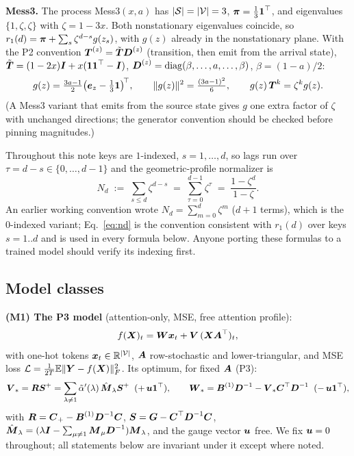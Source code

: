 \documentclass{article}
\begin{document}
\textbf{Mess3.} The process Mess3$(x,a)$ has ${\vert \mathcal{S}\vert} = {\vert \mathcal{V}\vert} = 3$, $\boldsymbol{\pi} = \tfrac13\boldsymbol{1}^\top$, and eigenvalues $\{1, \zeta, \zeta\}$ with $\zeta = 1 - 3x$. Both nonstationary eigenvalues coincide, so $r_1(d) = \boldsymbol{\pi} + \sum_s \zeta^{d-s} g(z_s)$, with $g(z)$ already in the nonstationary plane. With the P2 convention $\boldsymbol{T}^{(z)} = \tilde{\boldsymbol{T}}\boldsymbol{D}^{(z)}$ (transition, then emit from the arrival state), $\tilde{\boldsymbol{T}} = (1-2x)\boldsymbol{I} + x(\boldsymbol{1}\boldsymbol{1}^\top - \boldsymbol{I})$, $\boldsymbol{D}^{(z)} = \mathrm{diag}(\beta, \dots, a, \dots, \beta)$, $\beta = (1-a)/2$:
\begin{equation}\label{eq:gz}
    g(z) = \tfrac{3a-1}{2}\big(\boldsymbol{e}_z - \tfrac13\boldsymbol{1}\big)^{\!\top}, \qquad
    \|g(z)\|^2 = \tfrac{(3a-1)^2}{6}, \qquad
    g(z)\,\boldsymbol{T}^{k} = \zeta^{k} g(z) .
\end{equation}
(A Mess3 variant that emits from the source state gives $g$ one extra factor of $\zeta$ with unchanged directions; the generator convention should be checked before pinning magnitudes.)

\begin{remark}\label{rem:nd}
Throughout this note keys are $1$-indexed, $s = 1, \dots, d$, so lags run over $\tau = d-s \in \{0, \dots, d-1\}$ and the geometric-profile normalizer is
\begin{equation}\label{eq:nd}
    N_d \;:=\; \sum_{s \le d}\zeta^{d-s} \;=\; \sum_{\tau=0}^{d-1}\zeta^{\tau} \;=\; \frac{1-\zeta^{d}}{1-\zeta}.
\end{equation}
An earlier working convention wrote $N_d = \sum_{m=0}^{d}\zeta^m$ ($d{+}1$ terms), which is the $0$-indexed variant; Eq.~\eqref{eq:nd} is the convention consistent with $r_1(d)$ over keys $s = 1..d$ and is used in every formula below. Anyone porting these formulas to a trained model should verify its indexing first.
\end{remark}

\subsection{Model classes}

\textbf{(M1) The P3 model} (attention-only, MSE, free attention profile):
\begin{equation}\label{eq:m1}
    f(\boldsymbol{X})_t = \boldsymbol{W}\boldsymbol{x}_t + \boldsymbol{V}\,(\boldsymbol{X}\boldsymbol{A}^\top)_t ,
\end{equation}
with one-hot tokens $\boldsymbol{x}_t \in \mathbb{R}^{{\vert \mathcal{V}\vert}}$, $\boldsymbol{A}$ row-stochastic and lower-triangular, and MSE loss $\mathcal{L} = \frac{1}{2T}\mathbb{E}\Vert {\boldsymbol{Y}- f(\boldsymbol{X})} \Vert_{F}^2$. Its optimum, for fixed $\boldsymbol{A}$ (P3):
\begin{equation}\label{eq:m1opt}
    \boldsymbol{V}_* = \boldsymbol{R}\boldsymbol{S}^+ = \sum_{\lambda\ne1}\Tilde{\alpha}'(\lambda)\,\hat{\boldsymbol{M}}_\lambda\boldsymbol{S}^+ \;\;(+\,\boldsymbol{u}\boldsymbol{1}^\top), \qquad
    \boldsymbol{W}_* = \boldsymbol{B}^{(1)}\boldsymbol{D}^{-1} - \boldsymbol{V}_*\boldsymbol{C}^\top\boldsymbol{D}^{-1}\;\;(-\,\boldsymbol{u}\boldsymbol{1}^\top),
\end{equation}
with $\boldsymbol{R} = \boldsymbol{C}_+ - \boldsymbol{B}^{(1)}\boldsymbol{D}^{-1}\boldsymbol{C}$, $\boldsymbol{S} = \boldsymbol{G} - \boldsymbol{C}^\top\boldsymbol{D}^{-1}\boldsymbol{C}$, $\hat{\boldsymbol{M}}_\lambda = (\lambda\boldsymbol{I} - \sum_{\mu\ne1}\boldsymbol{M}_\mu\boldsymbol{D}^{-1})\boldsymbol{M}_\lambda$, and the gauge vector $\boldsymbol{u}$ free. We fix $\boldsymbol{u} = 0$ throughout; all statements below are invariant under it except where noted.
\end{document}
